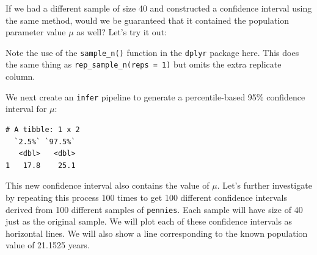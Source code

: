 \documentclass[]{article}
\newenvironment{Shaded}{\begin{snugshade}}{\end{snugshade}}
\newcommand{\KeywordTok}[1]{\textcolor[rgb]{0.13,0.29,0.53}{\textbf{#1}}}
\newcommand{\DataTypeTok}[1]{\textcolor[rgb]{0.13,0.29,0.53}{#1}}
\newcommand{\DecValTok}[1]{\textcolor[rgb]{0.00,0.00,0.81}{#1}}
\newcommand{\StringTok}[1]{\textcolor[rgb]{0.31,0.60,0.02}{#1}}
\newcommand{\OtherTok}[1]{\textcolor[rgb]{0.56,0.35,0.01}{#1}}
\newcommand{\OperatorTok}[1]{\textcolor[rgb]{0.81,0.36,0.00}{\textbf{#1}}}
\newcommand{\NormalTok}[1]{#1}
\begin{document}
If we had a different sample of size 40 and constructed a confidence
interval using the same method, would we be guaranteed that it contained
the population parameter value \(\mu\) as well? Let's try it out:

\begin{Shaded}
\end{Shaded}

Note the use of the \texttt{sample\_n()} function in the \texttt{dplyr}
package here. This does the same thing as
\texttt{rep\_sample\_n(reps\ =\ 1)} but omits the extra replicate
column.

We next create an \texttt{infer} pipeline to generate a percentile-based
95\% confidence interval for \(\mu\):

\begin{Shaded}
\end{Shaded}

\begin{verbatim}
# A tibble: 1 x 2
  `2.5%` `97.5%`
   <dbl>   <dbl>
1   17.8    25.1
\end{verbatim}

This new confidence interval also contains the value of \(\mu\). Let's
further investigate by repeating this process 100 times to get 100
different confidence intervals derived from 100 different samples of
\texttt{pennies}. Each sample will have size of 40 just as the original
sample. We will plot each of these confidence intervals as horizontal
lines. We will also show a line corresponding to the known population
value of 21.1525 years.
\end{document}
